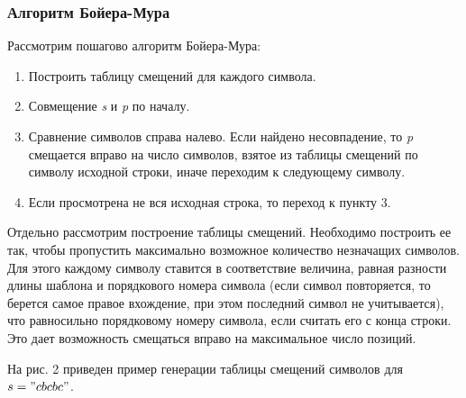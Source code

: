 \documentclass[a4paper,12pt]{article}
\begin{document}
\subsubsection{Алгоритм Бойера-Мура}

Рассмотрим пошагово алгоритм Бойера-Мура:
\begin{enumerate}
\item Построить таблицу смещений для каждого символа.
\item Совмещение \textit{s} и \textit{p} по началу.
\item Сравнение символов справа налево. Если найдено несовпадение, то \textit{p} смещается вправо на число символов, взятое из таблицы смещений по символу исходной строки, иначе переходим к следующему символу.
\item Если просмотрена не вся исходная строка, то переход к пункту 3.
\end{enumerate}

Отдельно рассмотрим построение таблицы смещений. Необходимо построить ее так, чтобы пропустить максимально возможное количество незначащих символов. Для этого каждому символу ставится в соответствие величина, равная разности длины шаблона и порядкового номера символа (если символ повторяется, то берется самое правое вхождение, при этом последний символ не учитывается), что равносильно порядковому номеру символа, если считать его с конца строки. Это дает возможность смещаться вправо на максимальное число позиций.

На рис. 2 приведен пример генерации таблицы смещений символов для $s = "cbcbc"$.
\end{document}
